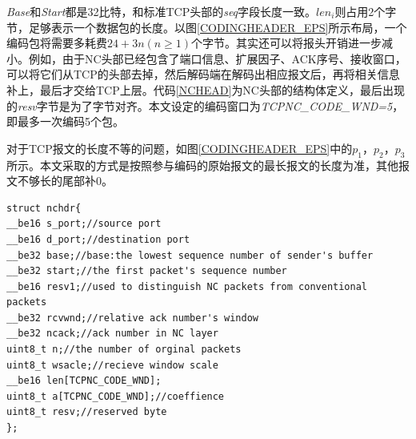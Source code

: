 \par
\emph{Base}和\emph{Start}都是32比特，和标准TCP头部的\emph{seq}字段长度一致。$len_{i}$则占用2个字节，足够表示一个数据包的长度。以图\ref{CODINGHEADER_EPS}所示布局，一个编码包将需要多耗费$24+3n\left(n \ge 1\right)$个字节。其实还可以将报头开销进一步减小。例如，由于NC头部已经包含了端口信息、扩展因子、ACK序号、接收窗口，可以将它们从TCP的头部去掉，然后解码端在解码出相应报文后，再将相关信息补上，最后才交给TCP上层。代码\ref{NCHEAD}为NC头部的结构体定义，最后出现的\emph{resv}字节是为了字节对齐。本文设定的编码窗口为\emph{TCPNC\_CODE\_WND=5}，即最多一次编码5个包。
\par
对于TCP报文的长度不等的问题，如图\ref{CODINGHEADER_EPS}中的$p_{1}$，$p_{2}$，$p_{3}$所示。本文采取的方式是按照参与编码的原始报文的最长报文的长度为准，其他报文不够长的尾部补0。
	\begin{lstlisting}[float,caption=NC头部结构,label={NCHEAD},language={[ANSI]C}]
struct nchdr{
__be16 s_port;//source port
__be16 d_port;//destination port
__be32 base;//base:the lowest sequence number of sender's buffer
__be32 start;//the first packet's sequence number
__be16 resv1;//used to distinguish NC packets from conventional packets
__be32 rcvwnd;//relative ack number's window
__be32 ncack;//ack number in NC layer
uint8_t n;//the number of orginal packets
uint8_t wsacle;//recieve window scale
__be16 len[TCPNC_CODE_WND];
uint8_t a[TCPNC_CODE_WND];//coeffience
uint8_t resv;//reserved byte
};
	\end{lstlisting}
